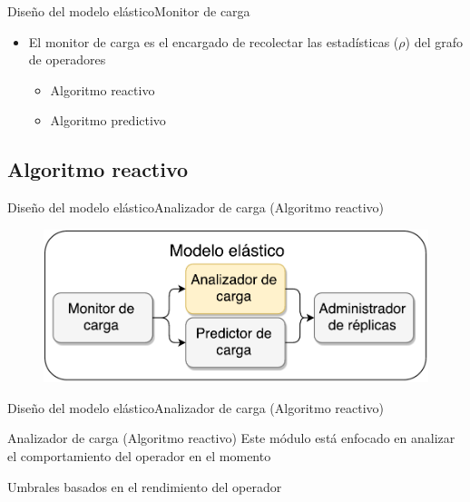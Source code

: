 \begin{frame}{Diseño del modelo elástico}{Monitor de carga}
\begin{itemize}
\item El monitor de carga es el encargado de recolectar las estadísticas ($\rho$) del grafo de operadores 
\begin{itemize}
	\item Algoritmo reactivo
	\item Algoritmo predictivo
\end{itemize}
\end{itemize}

\end{frame}

\subsection*{Algoritmo reactivo}
\begin{frame}{Diseño del modelo elástico}{Analizador de carga (Algoritmo reactivo)}
\begin{figure}
	\includegraphics[scale=0.5]{images/Modelo-vSlides-II.pdf}
\end{figure}
\end{frame}

\begin{frame}{Diseño del modelo elástico}{Analizador de carga (Algoritmo reactivo)}
\begin{block}{Analizador de carga (Algoritmo reactivo)}
	Este módulo está enfocado en analizar el comportamiento del operador en el momento
\end{block}

\pause
\begin{alertblock}{}
	\centering
	Umbrales basados en el rendimiento del operador
\end{alertblock}
\end{frame}

